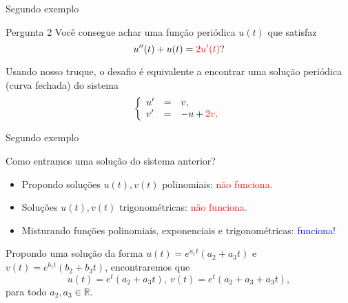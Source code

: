\documentclass[11pt]{beamer}
\newcommand{\R}{\mathbb R}
\begin{document}
\begin{frame}[t]{Segundo exemplo}

\begin{block}{Pergunta 2}
Você consegue achar uma função periódica $u(t)$ que satisfaz 
\[
u''(t)+u(t)=\textcolor{red}{2u'(t)}?
\]
\end{block}
 \pause 
Usando nosso truque, o desafio é equivalente a encontrar uma solução periódica (curva fechada) do sistema
\begin{equation}\label{3}\left\{\begin{array}{lcl}
u'&=&v,\\
v'&=&-u+\textcolor{red}{2v}.
\end{array}
\right.\end{equation}





\end{frame}

%
%
%
%
%



\begin{frame}[t]{Segundo exemplo}

Como entramos uma solução do sistema anterior?

\begin{itemize} \pause 
\item Propondo soluções $u(t),v(t)$ polinomiais: \textcolor{red}{não funciona.} \pause 
\item Soluções $u(t),v(t)$ trigonométricas: \textcolor{red}{não funciona.} \pause 
\item Misturando funções polinomiais, exponenciais e trigonométricas: \textcolor{blue}{funciona!} \pause 
\end{itemize}


Propondo uma solução da forma $u(t)=e^{a_1t}(a_2+a_3t)$ e $v(t)=e^{b_1t}(b_2+b_3t)$, encontraremos que
\[u(t)= e^t(a_2+a_3t), \ v(t)=e^t(a_2+a_3+a_3t),\] para todo $a_2,a_3\in\R$.
\end{frame}
\end{document}
